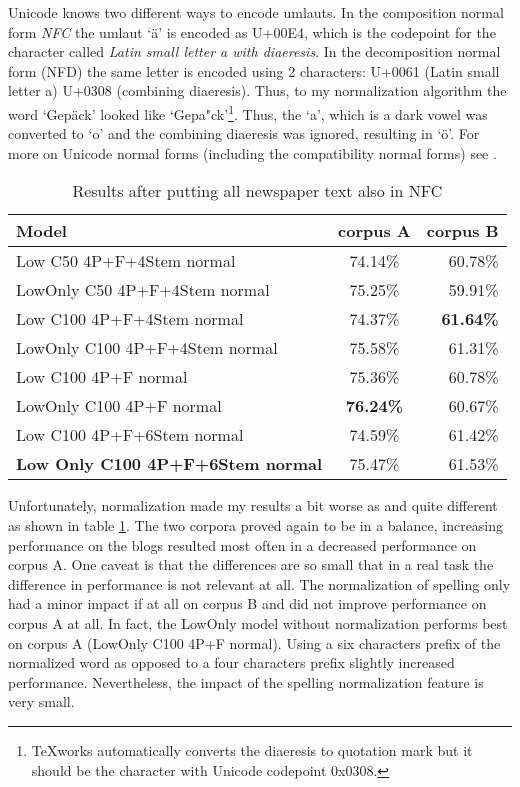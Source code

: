\documentclass[11pt,letterpaper, covington]{article}
\begin{document}
Unicode knows two different ways to encode umlauts.  In the composition normal form \emph{NFC} the umlaut `ä' is encoded as U+00E4, which is the codepoint for the character called \emph{Latin small letter a with diaeresis}. In the decomposition normal form (NFD) the same letter is encoded using 2 characters: U+0061 (Latin small letter a) U+0308 (combining diaeresis).  Thus, to my normalization algorithm the word `Gepäck' looked like `Gepa"ck'\footnote{TeXworks automatically converts the diaeresis to quotation mark but it should be the character with Unicode codepoint 0x0308.}. Thus, the `a', which is a dark vowel was converted to `o' and the combining diaeresis was ignored, resulting in `ö'. For more on Unicode normal forms (including the compatibility normal forms) see \citet{DK13}.

\begin{table}
\center
  \begin{tabular}{ | l || c | r | }
    \hline
   \textbf{Model} & \textbf{corpus A} & \textbf{corpus B}  \\ \hline
    Low C50 4P+F+4Stem normal & 74.14\% & 60.78\% \\
    LowOnly C50 4P+F+4Stem normal & 75.25\% & 59.91\% \\ 
    Low C100 4P+F+4Stem normal & 74.37\% & \textbf{61.64\%} \\
    LowOnly C100 4P+F+4Stem normal & 75.58\% & 61.31\% \\ 
    Low C100 4P+F normal & 75.36\% & 60.78\% \\
    LowOnly C100 4P+F normal & \textbf{76.24\%} & 60.67\% \\
    Low C100 4P+F+6Stem normal & 74.59\% & 61.42\% \\    
\textbf{Low Only C100 4P+F+6Stem normal} & 75.47\% & 61.53\% \\
 \hline
  \end{tabular}
\caption{Results after putting all newspaper text also in NFC}
\label{tab:fin}
\end{table}

Unfortunately, normalization made my results a bit worse as and quite different as shown in table \ref{tab:fin}. The two corpora proved again to be in a balance, increasing performance on the blogs resulted most often in a decreased performance on corpus A. One caveat is that the differences are so small that in a real task the difference in performance is not relevant at all. The normalization of spelling only had a minor impact if at all on corpus B and did not improve performance on corpus A at all. In fact, the LowOnly model without normalization performs best on corpus A (LowOnly  C100 4P+F normal). Using a six characters prefix of the normalized word as opposed to a four characters prefix slightly increased performance. Nevertheless, the impact of the spelling normalization feature is very small.
\end{document}

